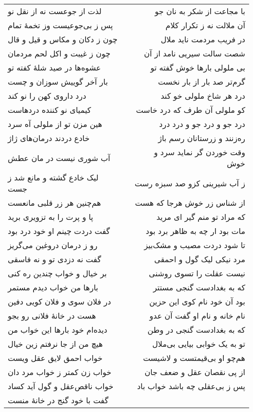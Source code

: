 \begin{center}
\begin{longtable}{l p{0.5cm} r}
لذت از جوعست نه از نقل نو
&&
با مجاعت از شکر به نان جو
\\
پس ز بی‌جوعیست وز تخمهٔ تمام
&&
آن ملالت نه ز تکرار کلام
\\
چون ز دکان و مکاس و قیل و قال
&&
در فریب مردمت ناید ملال
\\
چون ز غیبت و اکل لحم مردمان
&&
شصت سالت سیریی نامد از آن
\\
عشوه‌ها در صید شلهٔ کفته تو
&&
بی ملولی بارها خوش گفته تو
\\
بار آخر گوییش سوزان و چست
&&
گرم‌تر صد بار از بار نخست
\\
درد داروی کهن را نو کند
&&
درد هر شاخ ملولی خو کند
\\
کیمیای نو کننده دردهاست
&&
کو ملولی آن طرف که درد خاست
\\
هین مزن تو از ملولی آه سرد
&&
درد جو و درد جو و درد درد
\\
خادع دردند درمان‌های ژاژ
&&
ره‌زنند و زرستانان رسم باژ
\\
آب شوری نیست در مان عطش
&&
وقت خوردن گر نماید سرد و خوش
\\
لیک خادع گشته و مانع شد ز جست
&&
ز آب شیرینی کزو صد سبزه رست
\\
هم‌چنین هر زر قلبی مانعست
&&
از شناس زر خوش هرجا که هست
\\
پا و پرت را به تزویری برید
&&
که مراد تو منم گیر ای مرید
\\
گفت دردت چینم او خود درد بود
&&
مات بود ار چه به ظاهر برد بود
\\
رو ز درمان دروغین می‌گریز
&&
تا شود دردت مصیب و مشک‌بیز
\\
گفت نه دزدی تو و نه فاسقی
&&
مرد نیکی لیک گول و احمقی
\\
بر خیال و خواب چندین ره کنی
&&
نیست عقلت را تسوی روشنی
\\
بارها من خواب دیدم مستمر
&&
که به بغدادست گنجی مستتر
\\
در فلان سوی و فلان کویی دفین
&&
بود آن خود نام کوی این حزین
\\
هست در خانهٔ فلانی رو بجو
&&
نام خانه و نام او گفت آن عدو
\\
دیده‌ام خود بارها این خواب من
&&
که به بغدادست گنجی در وطن
\\
هیچ من از جا نرفتم زین خیال
&&
تو به یک خوابی بیایی بی‌ملال
\\
خواب احمق لایق عقل ویست
&&
هم‌چو او بی‌قیمتست و لاشیست
\\
خواب زن کمتر ز خواب مرد دان
&&
از پی نقصان عقل و ضعف جان
\\
خواب ناقص‌عقل و گول آید کساد
&&
پس ز بی‌عقلی چه باشد خواب باد
\\
گفت با خود گنج در خانهٔ منست

\end{longtable}
\end{center}
